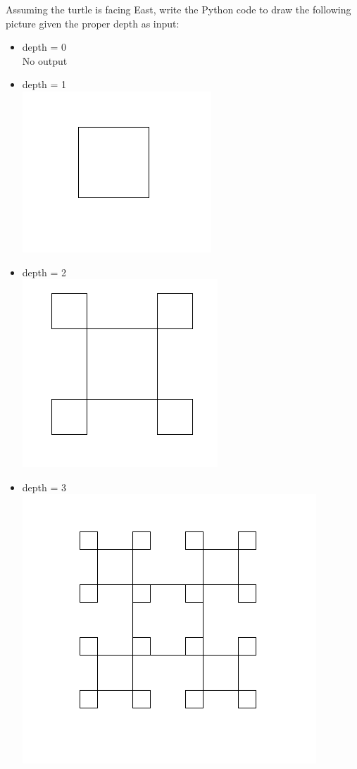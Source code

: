 Assuming the turtle is facing East, write the Python code to draw the following picture given the proper depth as input:
    \begin{itemize}
            \item depth = 0
           \\No output 
            \item depth = 1\\
            \includegraphics[scale=0.4]{other/1.png}
            \item depth = 2 \\
            \includegraphics[scale=0.4]{other/2.png}
            \item depth = 3\\
            \includegraphics[scale=0.4]{other/3.png}
        \end{itemize}
